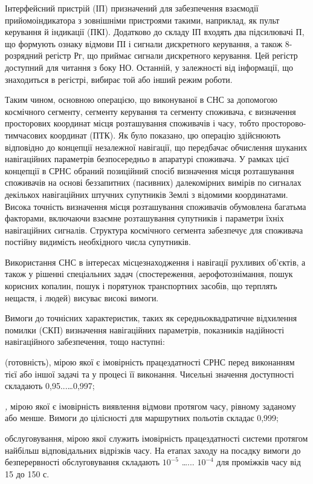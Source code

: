 Інтерфейсний пристрій (ІП) призначений для забезпечення взаємодії прийомоіндикатора з зовнішніми 
пристроями такими, наприклад, як пульт керування й індикації (ПКІ). Додатково до складу ІП входять 
два підсилювачі П, що формують ознаку відмови ПІ і сигнали дискретного керування, а також 8-розрядний 
регістр Рг, що приймає сигнали дискретного керування. Цей регістр доступний для читання з боку НО. 
Останній, у залежності від інформації, що знаходиться в регістрі, вибирає той або інший режим роботи.

Таким чином, основною операцією, що виконуваної в СНС за допомогою космічного сегменту, сегменту 
керування та сегменту споживача, є визначення просторових координат місця розташування споживачів і 
часу, тобто просторово-тимчасових координат (ПТК). Як було показано, цю операцію здійснюють відповідно 
до концепції незалежної навігації, що передбачає обчислення шуканих навігаційних параметрів 
безпосередньо в апаратурі споживача. У рамках цієї концепції в СРНС обраний позиційний спосіб 
визначення місця розташування споживачів на основі беззапитних (пасивних) далекомірних вимірів по 
сигналах декількох навігаційних штучних супутників Землі з відомими координатами. Висока точність 
визначення місця розташування споживачів обумовлена багатьма факторами, включаючи взаємне розташування 
супутників і параметри їхніх навігаційних сигналів. Структура космічного сегмента забезпечує для 
споживача постійну видимість необхідного числа супутників.




Використання СНС в інтересах місцезнаходження і навігації рухливих об'єктів, а також у рішенні 
спеціальних задач (спостереження, аерофотознімання, пошук корисних копалин, пошук і порятунок 
транспортних засобів, що терплять нещастя, і людей) висуває високі вимоги.

Вимоги до точнісних характеристик, таких як середньоквадратичне відхилення помилки (СКП) визначення 
навігаційних параметрів, показників надійності навігаційного забезпечення, тощо наступні:
\begin{itemize}
   (готовність),\textit{ }мірою якої є імовірність працездатності СРНС перед виконанням 
тієї або іншої задачі та у процесі її виконання. Чисельні значення доступності складають 0,95...\dots 0,997;

 \textit{,  }мірою якої є імовірність виявлення відмови протягом часу, рівному заданому 
або менше. Вимоги до цілісності для маршрутних польотів складає 0,999;

  обслуговування,\textit{ }мірою якої служить імовірність працездатності системи 
протягом найбільш відповідальних відрізків часу. На етапах заходу на посадку вимоги до безперервності 
обслуговування складають $10^{-5}$ \dots ... $10^{-4}$ для проміжків часу від 15 до 150 с.
\end{itemize}



